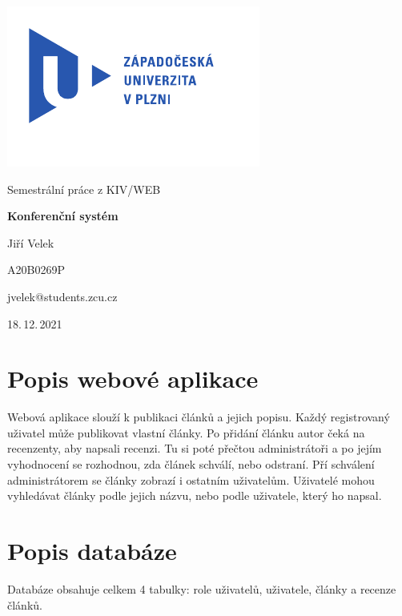 \documentclass[
	12pt,
	a4paper,
	pdftex,
	czech,
	titlepage
]{report}
\begin{document}
\begin{titlepage}
	\vspace*{-2cm}
	{\centering\includegraphics[scale=1.0]{logo.pdf}\par}
	\centering
	\vspace*{2cm}
	{\Large Semestrální práce z KIV/WEB\par}
	\vspace{1.5cm}
	{\Huge\bfseries Konferenční systém\par}
	\vspace{2cm}

	{\Large Jiří Velek\par}
	{\Large A20B0269P\par}
	{\Large jvelek@students.zcu.cz\par}

	\vfill

	{\Large 18.\,12.\,2021}
\end{titlepage}

\tableofcontents
\thispagestyle{empty}
\clearpage

\chapter{Popis webové aplikace}
\setcounter{page}{1}
Webová aplikace slouží k publikaci článků a jejich popisu. Každý registrovaný
uživatel může publikovat vlastní články. Po přidání článku autor čeká na
recenzenty, aby napsali recenzi. Tu si poté přečtou administrátoři a po jejím
vyhodnocení se rozhodnou, zda článek schválí, nebo odstraní.
Pří schválení administrátorem se články zobrazí i ostatním uživatelům.
Uživatelé mohou
vyhledávat články podle jejich názvu, nebo podle uživatele, který ho napsal.

\chapter{Popis databáze}
Databáze obsahuje celkem 4 tabulky: role uživatelů, uživatele, články a recenze
článků.
\end{document}
